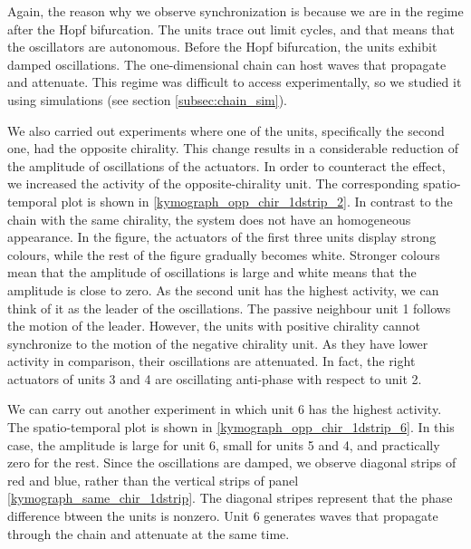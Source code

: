 \documentclass[11pt, a4paper]{article} %
\begin{document}
Again, the reason why we observe synchronization 
is because we are in the regime after the Hopf bifurcation. The units trace out limit cycles, and that means that the oscillators are 
autonomous. Before the Hopf bifurcation, the units exhibit damped oscillations. The one-dimensional chain can host waves that 
propagate and attenuate. This regime was difficult to access experimentally, so we studied it using simulations (see section \ref{subsec:chain_sim}).

We also carried out experiments where one of the units, specifically the second one, had the opposite chirality. This change results 
in a considerable reduction of the amplitude of oscillations of the actuators. In order to counteract the effect, we increased 
the activity of the opposite-chirality unit. The corresponding spatio-temporal plot is shown in \ref{kymograph_opp_chir_1dstrip_2}. In contrast to the chain with 
the same chirality, the system does not have an homogeneous appearance. In the figure, the actuators of the first three units display 
strong colours, while the rest of the figure gradually becomes white. Stronger colours mean that the amplitude of oscillations is large 
and white means that the amplitude is close to zero. As the second unit has the highest activity, we can think of it as the leader of 
the oscillations. The passive neighbour unit 1 follows the motion of the leader. However, the units with positive chirality cannot 
synchronize to the motion of the negative chirality unit. As they have lower activity in comparison, their oscillations are attenuated. 
In fact, the right actuators of units 3 and 4 are oscillating anti-phase with respect to unit 2. 

We can carry out another experiment in which unit 6 has the highest activity. The spatio-temporal plot is shown in \ref{kymograph_opp_chir_1dstrip_6}. 
In this case, the amplitude is large for unit 6, small for units 5 and 4, and practically zero for the rest. Since the 
oscillations are damped, we observe diagonal strips of red and blue, rather than the vertical strips of panel \ref{kymograph_same_chir_1dstrip}. 
The diagonal stripes represent that the phase difference btween the units is nonzero. 
Unit 6 generates waves that propagate through the chain and attenuate at the same time. 
\end{document}
